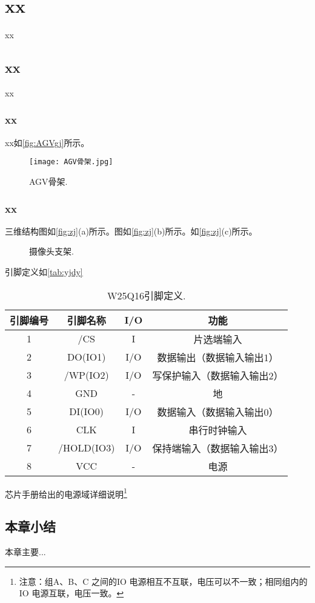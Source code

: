
\chapter{xx}
xx

\section{xx}
xx
\subsection{xx}
xx如\autoref{fig:AGVgj}所示。
\begin{figure}[H]
    \centering
    \texttt{[image: AGV骨架.jpg]}
    \caption{AGV骨架.}
    \label{fig:AGVgj}
\end{figure}

\subsection{xx}
三维结构图如\autoref{fig:zj}(a)所示。图如\autoref{fig:zj}(b)所示。如\autoref{fig:zj}(c)所示。
\begin{figure}[H]
    \centering
    \hfill
    \hfill
    \caption{摄像头支架.}
    \label{fig:zj}
  \end{figure}

引脚定义如\autoref{tab:yjdy}
\begin{table}[H]
    \centering
    \small
    \caption{W25Q16引脚定义.}
    \label{tab:yjdy}
    \begin{tabular}{cccc}
    \toprule
    引脚编号 & 引脚名称       & I/O & 功能             \\ \midrule
    1    & /CS        & I   & 片选端输入          \\
    2    & DO(IO1)    & I/O & 数据输出（数据输入输出1）  \\
    3    & /WP(IO2)   & I/O & 写保护输入（数据输入输出2） \\
    4    & GND        & -   & 地              \\
    5    & DI(IO0)    & I/O & 数据输入（数据输入输出0）  \\
    6    & CLK        & I   & 串行时钟输入         \\
    7    & /HOLD(IO3) & I/O & 保持端输入（数据输入输出3） \\
    8    & VCC        & -   & 电源             \\ \bottomrule
\end{tabular}
\end{table}
芯片手册给出的电源域详细说明\footnote{注意：组A、B、C 之间的IO 电源相互不互联，电压可以不一致；相同组内的IO 电源互联，电压一致。}


\section{本章小结}
本章主要...
